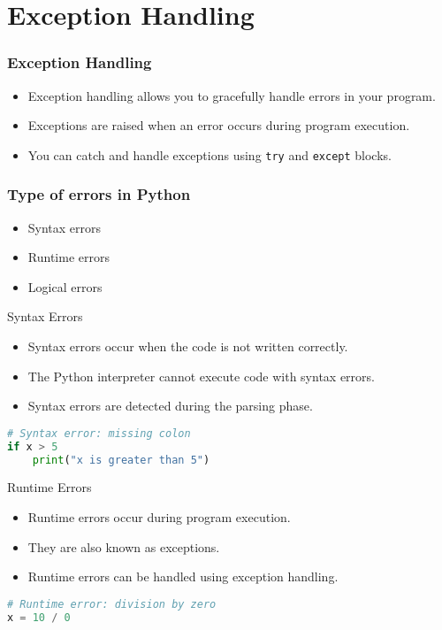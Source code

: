 \section{Exception Handling}
\begin{frame}
    \frametitle{Exception Handling}
    \begin{itemize}
        \item Exception handling allows you to gracefully handle errors in your program.
        \item Exceptions are raised when an error occurs during program execution.
        \item You can catch and handle exceptions using \texttt{try} and \texttt{except} blocks.
    \end{itemize}
\end{frame} 

\begin{frame}
    \frametitle{Type of errors in Python}
    \begin{itemize}
        \item Syntax errors
        \item Runtime errors
        \item Logical errors
    \end{itemize}   
\end{frame} 

\begin{frame}[fragile]{Syntax Errors}
    \begin{itemize}
        \item Syntax errors occur when the code is not written correctly.
        \item The Python interpreter cannot execute code with syntax errors.
        \item Syntax errors are detected during the parsing phase.
    \end{itemize}
    \begin{lstlisting}[style=colorful, language=Python]
# Syntax error: missing colon
if x > 5
    print("x is greater than 5")
    \end{lstlisting}
\end{frame} 

\begin{frame}[fragile]{Runtime Errors}
    \begin{itemize}
        \item Runtime errors occur during program execution.
        \item They are also known as exceptions.
        \item Runtime errors can be handled using exception handling.
    \end{itemize}
    \begin{lstlisting}[style=colorful, language=Python]
# Runtime error: division by zero
x = 10 / 0
    \end{lstlisting}
\end{frame} 

